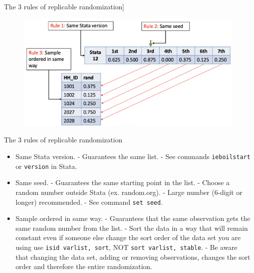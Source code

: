 \documentclass[aspectratio=169]{beamer}
\begin{document}
\begin{frame}{The 3 rules of replicable randomization]}

\begin{figure}
	\centering
	\includegraphics[width=\linewidth]{img/Randomization8}
\end{figure}

\end{frame}


\begin{frame}{The 3 rules of replicable randomization}
\begin{multicols}{2}	

\begin{itemize}[<default overlay specification>]
	\item<1>  Same Stata version.
		\newline - Guarantees the same list.
		\newline - See commands \texttt{ieboilstart} or \texttt{version} in Stata.
	\item<1>  Same seed.
		\newline - Guarantees the same starting point in the list.
		\newline - Choose a random number outside Stata (ex. random.org).
		\newline - Large number (6-digit or longer) recommended.
		\newline - See command \texttt{set seed}.
	\item<1>  Sample ordered in same way.
		\newline - Guarantees that the same observation gets the same random number from the list.
		\newline - Sort the data in a way that will remain constant even if someone else change the sort order of the data set you are using use \texttt{isid varlist, sort}, NOT \texttt{sort varlist, stable}.
		\newline - Be aware that changing the data set, adding or removing observations, changes the sort order and therefore the entire randomization.
\end{itemize}

\end{multicols}
\end{frame}
\end{document}
